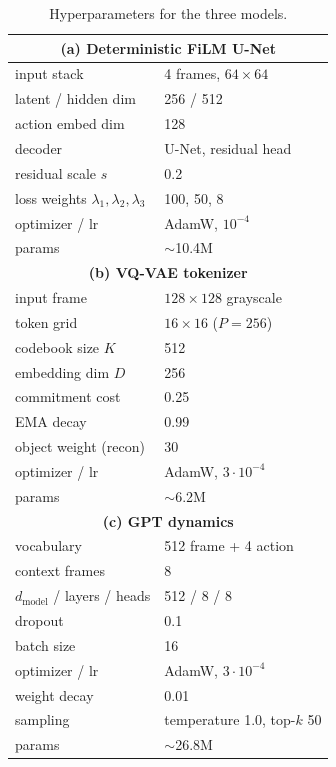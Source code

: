 \documentclass[10pt,twocolumn,letterpaper]{article}
\begin{document}
\begin{table}[t]
\centering\footnotesize
\renewcommand{\arraystretch}{1.1}
\begin{tabular}{ll}
\multicolumn{2}{c}{\textbf{(a) Deterministic FiLM U-Net}}\\
\toprule
input stack & 4 frames, $64\!\times\!64$ \\
latent / hidden  dim & 256 / 512 \\
action embed dim & 128 \\
decoder & U-Net, residual head \\
residual scale $s$ & 0.2 \\
loss weights $\lambda_1,\lambda_2,\lambda_3$ & 100, 50, 8 \\
optimizer / lr & AdamW, $10^{-4}$ \\
params & $\sim$10.4M \\
\midrule[\heavyrulewidth]
\multicolumn{2}{c}{\textbf{(b) VQ-VAE tokenizer}}\\
\toprule
input frame & $128\!\times\!128$ grayscale \\
token grid & $16\!\times\!16$ ($P{=}256$) \\
codebook size $K$ & 512 \\
embedding dim $D$ & 256 \\
commitment cost & 0.25 \\
EMA decay & 0.99 \\
object weight (recon) & 30 \\
optimizer / lr & AdamW, $3\!\cdot\!10^{-4}$ \\
params & $\sim$6.2M \\
\midrule[\heavyrulewidth]
\multicolumn{2}{c}{\textbf{(c) GPT dynamics}}\\
\toprule
vocabulary & 512 frame + 4 action \\
context frames & 8 \\
$d_{\text{model}}$ / layers / heads & 512 / 8 / 8 \\
dropout & 0.1 \\
batch size & 16 \\
optimizer / lr & AdamW, $3\!\cdot\!10^{-4}$ \\
weight decay & 0.01 \\
sampling & temperature 1.0, top-$k$ 50 \\
params & $\sim$26.8M \\
\bottomrule
\end{tabular}
\caption{Hyperparameters for the three models.}
\label{tab:hp}
\end{table}
\end{document}
